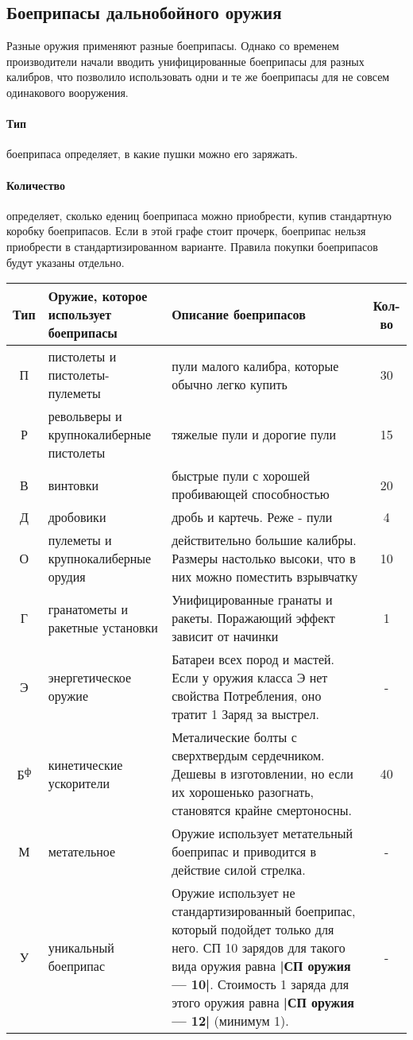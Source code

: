 \subsection{Боеприпасы дальнобойного оружия}
Разные оружия применяют разные боеприпасы. Однако со временем производители начали вводить унифицированные боеприпасы для разных калибров, что позволило использовать одни и те же боеприпасы для не совсем одинакового вооружения.
\paragraph{Тип} боеприпаса определяет, в какие пушки можно его заряжать.
\paragraph{Количество} определяет, сколько едениц боеприпаса можно приобрести, купив стандартную коробку боеприпасов. Если в этой графе стоит прочерк, боеприпас нельзя приобрести в стандартизированном варианте. Правила покупки боеприпасов будут указаны отдельно.
\begin{tabular}{|c|p{3cm}|p{10cm}|c|}
\hline
Тип & Оружие, которое использует боеприпасы & Описание боеприпасов & Кол-во\\ \hline
П & пистолеты и пистолеты-пулеметы & пули малого калибра, которые обычно легко купить & 30\\ \hline
Р & револьверы и крупнокалиберные пистолеты & тяжелые пули и дорогие пули & 15\\ \hline
В & винтовки & быстрые пули с хорошей пробивающей способностью & 20\\ \hline
Д & дробовики & дробь и картечь. Реже - пули & 4\\ \hline
О & пулеметы и крупнокалиберные орудия & действительно большие калибры. Размеры настолько высоки, что в них можно поместить взрывчатку & 10\\ \hline
Г & гранатометы и ракетные установки & Унифицированные гранаты и ракеты. Поражающий эффект зависит от начинки & 1\\ \hline
Э & энергетическое оружие & Батареи всех пород и мастей. Если у оружия класса Э нет свойства Потребления, оно тратит 1 Заряд за выстрел. & -\\ \hline
Б\textsuperscript{ф} & кинетические ускорители & Металические болты с сверхтвердым сердечником. Дешевы в изготовлении, но если их хорошенько разогнать, становятся крайне смертоносны. & 40\\ \hline
М & метательное & Оружие использует метательный боеприпас и приводится в действие силой стрелка. & -\\ \hline
У & уникальный боеприпас & Оружие использует не стандартизированный боеприпас, который подойдет только для него. СП 10 зарядов для такого вида оружия равна \textbf{|СП оружия — 10|}. Стоимость 1 заряда для этого оружия равна \textbf{|СП оружия — 12|} (минимум 1). & -\\ \hline
\end{tabular}

